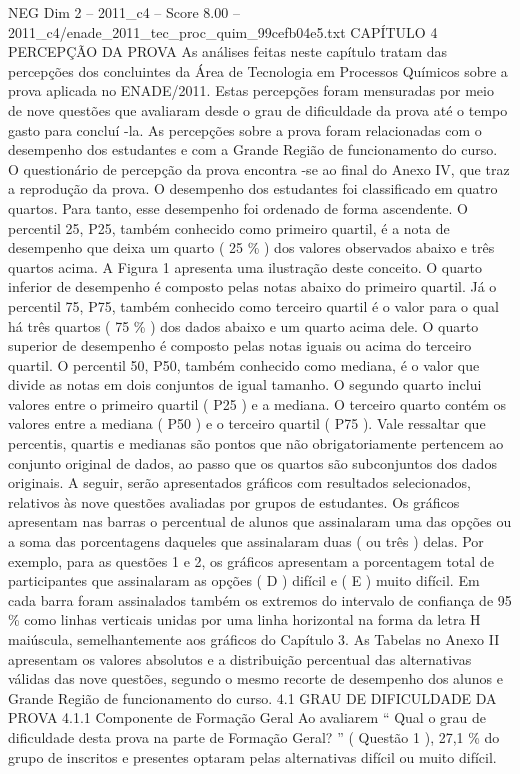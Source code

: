 \begin{textsample}{NEG Dim 2 – 2011\_c4 – Score 8.00 – 2011\_c4/enade\_2011\_tec\_proc\_quim\_99cefb04e5.txt}  \label{ex:f2_neg_308}
CAPÍTULO 4 PERCEPÇÃO DA PROVA As análises feitas neste capítulo tratam das percepções dos concluintes da Área de Tecnologia em Processos Químicos sobre a prova aplicada no ENADE/2011.
Estas percepções foram mensuradas por meio de nove questões que avaliaram desde o grau de dificuldade da prova até o tempo gasto para concluí -la.
As percepções sobre a prova foram relacionadas com o desempenho dos estudantes e com a Grande Região de funcionamento do curso.
O questionário de percepção da prova encontra -se ao final do Anexo IV, que traz a reprodução da prova.
O desempenho dos estudantes foi classificado em quatro quartos.
Para tanto, esse desempenho foi ordenado de forma ascendente.
O percentil 25, P25, também conhecido como primeiro quartil, é a nota de desempenho que deixa um quarto ( 25 \% ) dos valores observados abaixo e três quartos acima.
A Figura 1 apresenta uma ilustração deste conceito.
O quarto inferior de desempenho é composto pelas notas abaixo do primeiro quartil.
Já o percentil 75, P75, também conhecido como terceiro quartil é o valor para o qual há três quartos ( 75 \% ) dos dados abaixo e um quarto acima dele.
O quarto superior de desempenho é composto pelas notas iguais ou acima do terceiro quartil.
O percentil 50, P50, também conhecido como mediana, é o valor que divide as notas em dois conjuntos de igual tamanho.
O segundo quarto inclui valores entre o primeiro quartil ( P25 ) e a mediana.
O terceiro quarto contém os valores entre a mediana ( P50 ) e o terceiro quartil ( P75 ).
Vale ressaltar que percentis, quartis e medianas são pontos que não obrigatoriamente pertencem ao conjunto original de dados, ao passo que os quartos são subconjuntos dos dados originais.
A seguir, serão apresentados gráficos com resultados selecionados, relativos às nove questões avaliadas por grupos de estudantes.
Os gráficos apresentam nas barras o percentual de alunos que assinalaram uma das opções ou a soma das porcentagens daqueles que assinalaram duas ( ou três ) delas.
Por exemplo, para as questões 1 e 2, os gráficos apresentam a porcentagem total de participantes que assinalaram as opções ( D ) difícil e ( E ) muito difícil.
Em cada barra foram assinalados também os extremos do intervalo de confiança de 95 \% como linhas verticais unidas por uma linha horizontal na forma da letra H maiúscula, semelhantemente aos gráficos do Capítulo 3.
As Tabelas no Anexo II apresentam os valores absolutos e a distribuição percentual das alternativas válidas das nove questões, segundo o mesmo recorte de desempenho dos alunos e Grande Região de funcionamento do curso. 4.1 GRAU DE DIFICULDADE DA PROVA 4.1.1 Componente de Formação Geral Ao avaliarem “ Qual o grau de dificuldade desta prova na parte de Formação Geral? ” ( Questão 1 ), 27,1 \% do grupo de inscritos e presentes optaram pelas alternativas difícil ou muito difícil.

\end{textsample}
